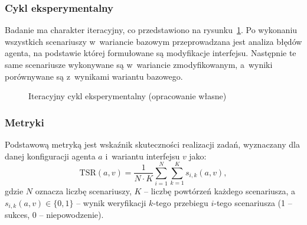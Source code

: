 \subsubsection{Cykl eksperymentalny}
Badanie ma charakter iteracyjny, co przedstawiono na rysunku~\ref{fig:cykl}. Po wykonaniu wszystkich scenariuszy w~wariancie bazowym przeprowadzana jest analiza błędów agenta, na podstawie której formułowane są modyfikacje interfejsu. Następnie te same scenariusze wykonywane są w~wariancie zmodyfikowanym, a~wyniki porównywane są z~wynikami wariantu bazowego.

\begin{figure}[H]
\centering
{}
\caption{Iteracyjny cykl eksperymentalny (opracowanie własne)}
\label{fig:cykl}
\end{figure}

\subsubsection{Metryki}
Podstawową metryką jest wskaźnik skuteczności realizacji zadań, wyznaczany dla danej konfiguracji agenta $a$ i~wariantu interfejsu $v$ jako:
\begin{equation}
    \mathrm{TSR}(a, v) = \frac{1}{N \cdot K} \sum_{i=1}^{N} \sum_{k=1}^{K} s_{i,k}(a, v),
    \label{eq:tsr}
\end{equation}
\noindent
gdzie $N$ oznacza liczbę scenariuszy, $K$ -- liczbę powtórzeń każdego scenariusza, a~$s_{i,k}(a, v) \in \{0, 1\}$ -- wynik weryfikacji $k$-tego przebiegu $i$-tego scenariusza (1 -- sukces, 0 -- niepowodzenie).


